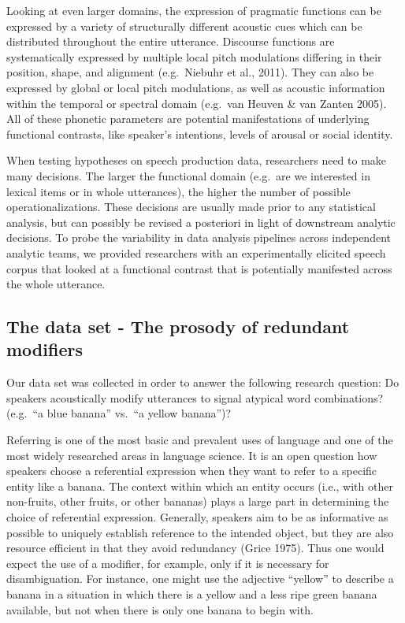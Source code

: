 \documentclass[
  english,
  man]{apa6}
\begin{document}
Looking at even larger domains, the expression of pragmatic functions can be expressed by a variety of structurally different acoustic cues which can be distributed throughout the entire utterance.
Discourse functions are systematically expressed by multiple local pitch modulations differing in their position, shape, and alignment (e.g.~Niebuhr et al., 2011).
They can also be expressed by global or local pitch modulations, as well as acoustic information within the temporal or spectral domain (e.g.~van Heuven \& van Zanten 2005).
All of these phonetic parameters are potential manifestations of underlying functional contrasts, like speaker's intentions, levels of arousal or social identity.

When testing hypotheses on speech production data, researchers need to make many decisions.
The larger the functional domain (e.g.~are we interested in lexical items or in whole utterances), the higher the number of possible operationalizations.
These decisions are usually made prior to any statistical analysis, but can possibly be revised a posteriori in light of downstream analytic decisions.
To probe the variability in data analysis pipelines across independent analytic teams, we provided researchers with an experimentally elicited speech corpus that looked at a functional contrast that is potentially manifested across the whole utterance.

\hypertarget{the-data-set---the-prosody-of-redundant-modifiers}{%
\subsection{The data set - The prosody of redundant modifiers}\label{the-data-set---the-prosody-of-redundant-modifiers}}

Our data set was collected in order to answer the following research question: Do speakers acoustically modify utterances to signal atypical word combinations? (e.g.~\enquote{a blue banana} vs.~\enquote{a yellow banana})?

Referring is one of the most basic and prevalent uses of language and one of the most widely researched areas in language science.
It is an open question how speakers choose a referential expression when they want to refer to a specific entity like a banana.
The context within which an entity occurs (i.e., with other non-fruits, other fruits, or other bananas) plays a large part in determining the choice of referential expression.
Generally, speakers aim to be as informative as possible to uniquely establish reference to the intended object, but they are also resource efficient in that they avoid redundancy (Grice 1975).
Thus one would expect the use of a modifier, for example, only if it is necessary for disambiguation.
For instance, one might use the adjective \enquote{yellow} to describe a banana in a situation in which there is a yellow and a less ripe green banana available, but not when there is only one banana to begin with.
\end{document}
